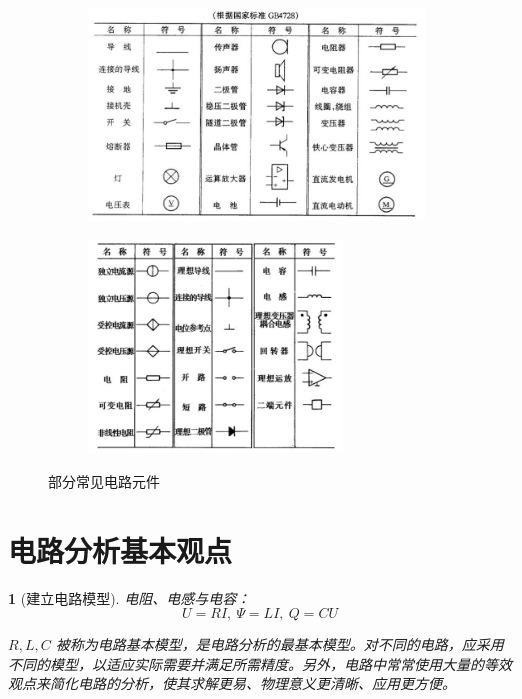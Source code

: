 \documentclass[UTF8]{report}
\theoremstyle{MyLineTheoremStyle} %
\theoremstyle{MyBlockTheoremStyle} %
\theoremstyle{MySubsubsectionStyle} %
\newtheorem{definition}{}
\begin{document}
\begin{figure}[H]\centering
\begin{subfigure}[t]{0.52\textwidth}\centering
    \includegraphics[height=160pt]{assets/1,2/7d3f6db847882c6447cc046186ede6ef.jpg}
\end{subfigure}\begin{subfigure}[t]{0.47\textwidth}\centering
    \includegraphics[height=160pt]{assets/1,2/3f5d73ec5ae9909ab42cd864852b0d72.jpg}
\end{subfigure}
\caption{部分常见电路元件}\label{部分常见电路元件}
\end{figure}





\section{电路分析基本观点}


\begin{definition}[建立电路模型]
电阻、电感与电容：
\begin{equation}
U = RI,\ \varPsi = LI,\ Q = CU
\end{equation}

$R, L, C$ 被称为电路基本模型，是电路分析的最基本模型。对不同的电路，应采用不同的模型，以适应实际需要并满足所需精度。另外，电路中常常使用大量的等效观点来简化电路的分析，使其求解更易、物理意义更清晰、应用更方便。

\end{definition}
\end{document}
